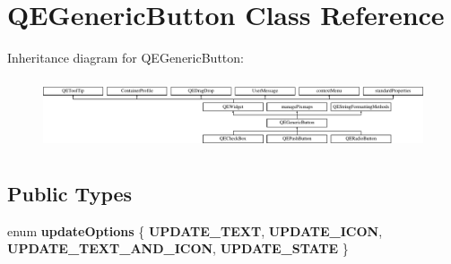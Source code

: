 \hypertarget{classQEGenericButton}{
\section{QEGenericButton Class Reference}
\label{classQEGenericButton}
}
Inheritance diagram for QEGenericButton:\begin{figure}[H]
\begin{center}
\leavevmode
\includegraphics[height=2.097378cm]{classQEGenericButton}
\end{center}
\end{figure}
\subsection*{Public Types}
\begin{DoxyCompactItemize}
\item 
enum {\bfseries updateOptions} \{ {\bfseries UPDATE\_\-TEXT}, 
{\bfseries UPDATE\_\-ICON}, 
{\bfseries UPDATE\_\-TEXT\_\-AND\_\-ICON}, 
{\bfseries UPDATE\_\-STATE}
 \}
\end{DoxyCompactItemize}
